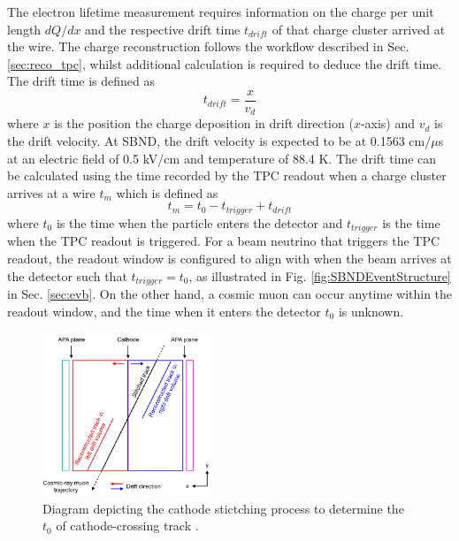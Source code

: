 The electron lifetime measurement requires information on the charge per unit length $dQ/dx$ and the respective drift time $t_{drift}$ of that charge cluster arrived at the wire.
The charge reconstruction follows the workflow described in Sec. \ref{sec:reco_tpc}, whilst additional calculation is required to deduce the drift time.     
The drift time is defined as 
\begin{equation}
        t_{drift} = \frac{x}{v_{d}}
\end{equation}
where $x$ is the position the charge deposition in drift direction ($x$-axis) and $v_{d}$ is the drift velocity.
At SBND, the drift velocity is expected to be at 0.1563 cm/$\mu$s at an electric field of 0.5 kV/cm and temperature of 88.4 K.
The drift time can be calculated using the time recorded by the TPC readout when a charge cluster arrives at a wire $t_{m}$ which is defined as \cite{pandora_protodune}
\begin{equation}
\label{eq:t0}
        t_{m} = t_{0} - t_{trigger} + t_{drift} 
\end{equation}
where $t_{0}$ is the time when the particle enters the detector and $t_{trigger}$ is the time when the TPC readout is triggered.
For a beam neutrino that triggers the TPC readout, the readout window is configured to align with when the beam arrives at the detector such that $t_{trigger} = t_{0}$, as illustrated in Fig. \ref{fig:SBNDEventStructure} in Sec. \ref{sec:evb}.
On the other hand, a cosmic muon can occur anytime within the readout window, and the time when it enters the detector $t_{0}$ is unknown.

\begin{figure}[bp!] 
\centering    
\includegraphics[width=0.45\textwidth]{cosmic_stitch}
\caption[Cathode Stitch Diagram]{
Diagram depicting the cathode stictching process to determine the $t_{0}$ of cathode-crossing track \cite{pandora_protodune}.
}
\label{fig:cosmic_stitch}
\end{figure}

